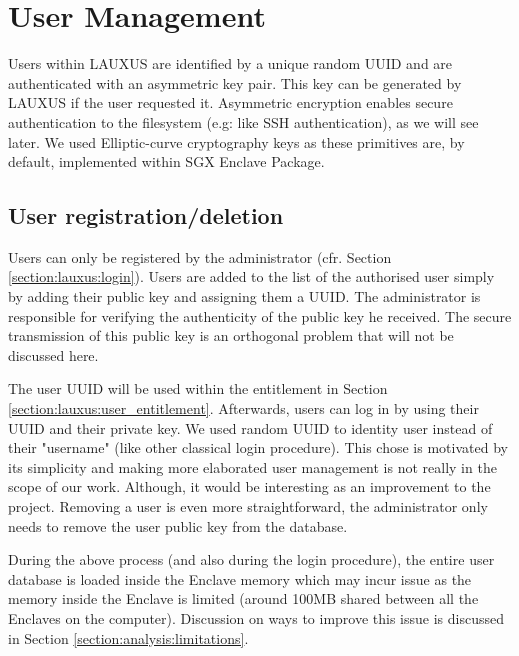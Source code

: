 \documentclass[../main.tex]{subfiles}
\begin{document}
\section{User Management}
\label{section:lauxus:user_mgnmt}

\par Users within LAUXUS are identified by a unique random UUID and are authenticated with an asymmetric key pair. This key can be generated by LAUXUS if the user requested it. Asymmetric encryption enables secure authentication to the filesystem (e.g: like SSH authentication), as we will see later. We used Elliptic-curve cryptography keys as these primitives are, by default, implemented within SGX Enclave Package.


\subsection{User registration/deletion}
\label{section:lauxus:user_registration/deletion}

\par Users can only be registered by the administrator (cfr. Section \ref{section:lauxus:login}). Users are added to the list of the authorised user simply by adding their public key and assigning them a UUID. The administrator is responsible for verifying the authenticity of the public key he received. The secure transmission of this public key is an orthogonal problem that will not be discussed here.
\par The user UUID will be used within the entitlement in Section \ref{section:lauxus:user_entitlement}. Afterwards, users can log in by using their UUID and their private key. We used random UUID to identity user instead of their "username" (like other classical login procedure). This chose is motivated by its simplicity and making more elaborated user management is not really in the scope of our work. Although, it would be interesting as an improvement to the project. Removing a user is even more straightforward, the administrator only needs to remove the user public key from the database.
\par During the above process (and also during the login procedure), the entire user database is loaded inside the Enclave memory which may incur issue as the memory inside the Enclave is limited (around 100MB shared between all the Enclaves on the computer). Discussion on ways to improve this issue is discussed in Section \ref{section:analysis:limitations}.


\newpage
\end{document}

